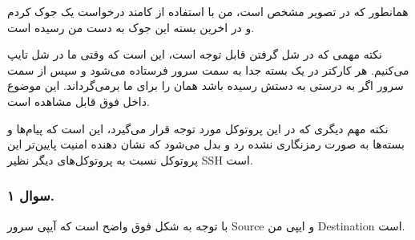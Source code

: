 همانطور که در تصویر مشخص است، من با استفاده از کامند 
درخواست یک جوک کردم و در اخرین بسته این جوک به دست من رسیده است.

نکته مهمی که در شل گرفتن قابل توجه است، این است که وقتی ما در شل تایپ می‌کنیم. هر کارکتر در یک بسته جدا به سمت سرور فرستاده می‌شود و سپس از سمت سرور اگر به درستی به دستش رسیده باشد همان را برای ما برمی‌گرداند. این موضوع داخل 
فوق قابل مشاهده است.


نکته مهم دیگری که در این پروتوکل مورد توجه قرار می‌گیرد، این است که پیام‌ها و بسته‌ها به صورت رمزنگاری نشده رد و بدل می‌شود که نشان دهنده امنیت پایین‌تر این پروتوکل نسبت به پروتوکل‌های دیگر نظیر SSH است.

\subsubsection*{سوال ۱.}


{
}

با توجه به شکل فوق واضح است که آیپی سرور Source و ایپی من Destination است.

{
}


